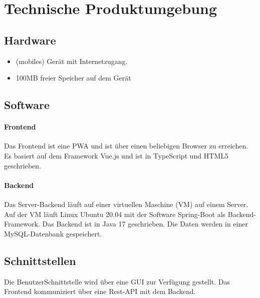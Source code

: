 \section{Technische Produktumgebung}
    \subsection{Hardware}
        \begin{itemize}
            \item (mobiles) Gerät mit Internetzugang.
            \item 100MB freier Speicher auf dem Gerät
        \end{itemize}
    \subsection{Software}
        \paragraph{Frontend}
            Das \Gls{Frontend} ist eine \Gls{PWA} und ist über einen beliebigen \Gls{Browser} zu erreichen.
            Es basiert auf dem  \Gls{Framework} \Gls{Vue.js} und ist in \Gls{TypeScript} und \Gls{HTML5} geschrieben.
            
        \paragraph{Backend}
            Das \Gls{Server}-\Gls{Backend} läuft auf einer virtuellen Maschine (\Gls{VM}) auf einem \Gls{Server}.
            Auf der \Gls{VM} läuft Linux Ubuntu 20.04 mit der Software \Gls{Spring-Boot} als \Gls{Backend}-\Gls{Framework}.
            Das \Gls{Backend} ist in \Gls{Java} 17 geschrieben.
            Die Daten werden in einer \Gls{MySQL}-\Gls{Datenbank} gespeichert.
    \subsection{Schnittstellen}
        Die Benutzer\gls{Schnittstelle} wird über eine \Gls{GUI} zur Verfügung gestellt.
        Das \Gls{Frontend} kommuniziert über eine \Gls{Rest}-\Gls{API} mit dem \Gls{Backend}.
        
            

